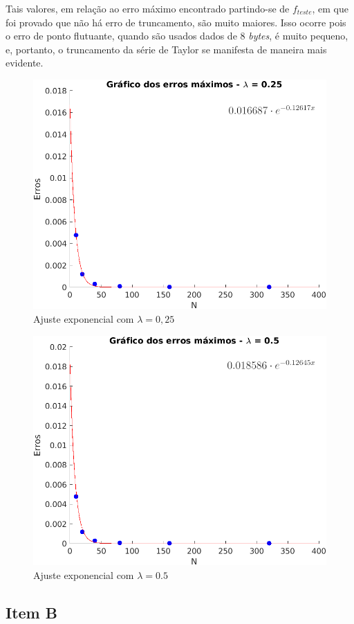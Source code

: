\documentclass[12pt]{article}
\begin{document}
\begin{spacing}{1.5}
Tais valores, em relação ao erro máximo encontrado partindo-se de $f_{teste}$, em que foi provado que não há erro de truncamento, são muito maiores. Isso ocorre pois o erro de ponto flutuante, quando são usados dados de 8 \textit{bytes}, é muito pequeno, e, portanto, o truncamento da série de Taylor se manifesta de maneira mais evidente.


\begin{figure}[ht]
    \centering
    \includegraphics[width=0.65\linewidth]{Primeira_Tarefa/ItemA/lambda0-25_Fit_Erro.png}
    \caption{Ajuste exponencial com $\lambda=0,25$}
    \label{fig:A_lambda0-25_Fit_Erro}
\end{figure} 
\begin{figure}[ht!]
    \centering
    \includegraphics[width=0.65\linewidth]{Primeira_Tarefa/ItemA/lambda0-5_Fit_Erro.png}
    \caption{Ajuste exponencial com $\lambda=0.5$}
    \label{fig:A_lambda0-5_Fit_Erro}
\end{figure} 


\subsection{Item B}


\end{spacing}
\end{document}

